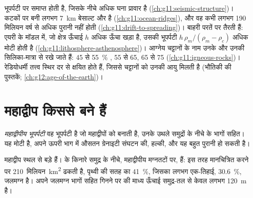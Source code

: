 \begin{recall}
भूपर्पटी  पर समाप्त होती है, जिसके नीचे अधिक घना प्रावार है
(\cref{ch:g11:seismic-structure})।  कटकों पर बनी लगभग \qty{7}{km}
बेसाल्ट और  है (\cref{ch:g11:ocean-ridges}), और वह
कभी लगभग 190 मिलियन वर्ष से अधिक पुरानी नहीं होती (\cref{ch:g11:drift-to-spreading})।
बाहरी परतें  पर तैरती हैं: एयरी के मॉडल में, जो क्षेत्र
ऊँचाई $h$ अधिक ऊँचा खड़ा है, उसकी भूपर्पटी $h\,\rho_m/(\rho_m -
\rho_c)$ अधिक मोटी होती है (\cref{ch:g11:lithosphere-asthenosphere})। आग्नेय चट्टानों के नाम
उनके  और उनकी सिलिका-मात्रा से रखे जाते हैं:  45 से
\qty{55}{\percent} ,  55 से 65,  65 से
75 (\cref{ch:g11:igneous-rocks})। रेडियोधर्मी तत्त्व स्थिर दर से क्षयित होते
हैं, जिससे चट्टानों को उनकी आयु मिलती है (भौतिकी की पुस्तकें;
\cref{ch:g12:age-of-the-earth})।
\end{recall}

\section{महाद्वीप किससे बने हैं}

\begin{definition}[महाद्वीपीय भूपर्पटी]\label{def:g12:continental-crust:continental-crust}
\emph{महाद्वीपीय भूपर्पटी} वह भूपर्पटी है जो
महाद्वीपों को बनाती है, उनके उथले समुद्रों के नीचे के भागों सहित। यह
मोटी है, अपने ऊपरी भाग में औसतन ग्रेनाइटी संघटन की, हल्की, और यह
बहुत पुरानी हो सकती है।
\end{definition}

महाद्वीप स्थल से बड़े हैं।  के किनारे
समुद्र के नीचे, महाद्वीपीय मग्नतटों पर, हैं: इस तरह मानचित्रित करने पर
 \num{210}~मिलियन~\unit{km^2} ढकती है, पृथ्वी की सतह का
\qty{41}{\percent}, जिसका लगभग एक-तिहाई, \qty{30.6}{\percent},
जलमग्न है। अपने जलमग्न भागों सहित गिनने पर
 की माध्य ऊँचाई समुद्र-तल से केवल लगभग \qty{120}{m} है।

